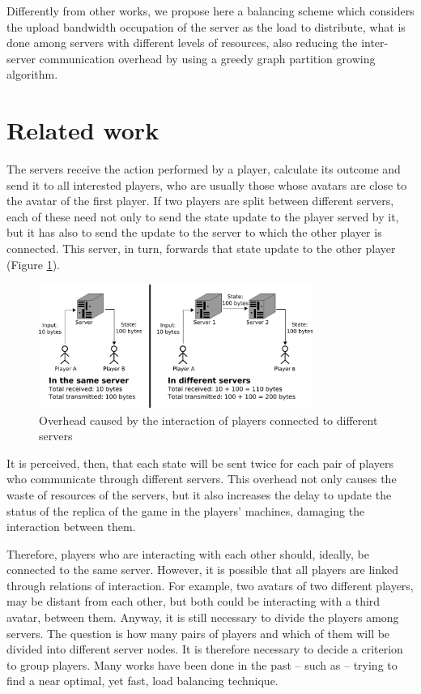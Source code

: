 Differently from other works, we propose here a balancing scheme which considers the upload bandwidth occupation of the server as the load to distribute, what is done among servers with different levels of resources, also reducing the inter-server communication overhead by using a greedy graph partition growing algorithm.


\section{Related work}
\label{sec:related}

The servers receive the action performed by a player, calculate its outcome and send it to all interested players, who are usually those whose avatars are close to the avatar of the first player. If two players are split between different servers, each of these need not only to send the state update to the player served by it, but it has also to send the update to the server to which the other player is connected. This server, in turn, forwards that state update to the other player (Figure \ref{fig:overheadgeneration}).

\begin{figure}
 \centering
 \includegraphics[width=0.8\textwidth]{images/overheadgeneration}
 \caption{Overhead caused by the interaction of players connected to different servers}
 \label{fig:overheadgeneration}
\end{figure}

It is perceived, then, that each state will be sent twice for each pair of players who communicate through different servers. This overhead not only causes the waste of resources of the servers, but it also increases the delay to update the status of the replica of the game in the players' machines, damaging the interaction between them.
	
Therefore, players who are interacting with each other should, ideally, be connected to the same server. However, it is possible that all players are linked through relations of interaction. For example, two avatars of two different players, may be distant from each other, but both could be interacting with a third avatar, between them. Anyway, it is still necessary to divide the players among servers. The question is how many pairs of players and which of them will be divided into different server nodes. It is therefore necessary to decide a criterion to group players. Many works have been done in the past -- such as \cite{devleeschauwer2005dma,lu2006lbm,chen2005lad,duong2003dls,ahmed2008mol} --  trying to find a near optimal, yet fast, load balancing technique.

